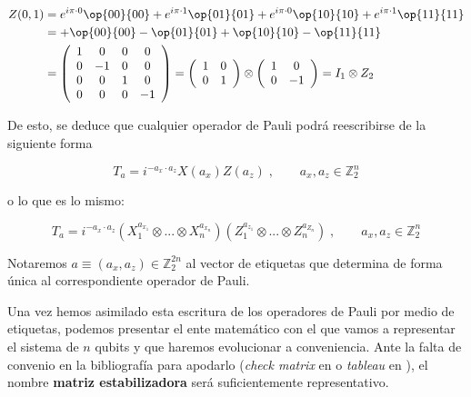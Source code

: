 \documentclass[11pt,a4paper,twoside,pdf]{article}
\numberwithin{equation}{section}
\begin{document}
		\begin{equation*}
			\begin{aligned}
			Z(0,1) &= e^{i\pi \cdot 0}\op{00}{00} + e^{i\pi \cdot 1} \op{01}{01} + e^{i\pi \cdot 0}\op{10}{10} +  
								e^{i\pi\cdot 1}\op{11}{11} \\ 
						&= +\op{00}{00} - \op{01}{01} + \op{10}{10} - \op{11}{11} \\
						&= \left(\begin{array}{cccc}
								1 & 0 & 0 & 0\\
								0 & -1 & 0 & 0\\
								0 & 0 & 1 & 0\\
								0 & 0 & 0 & -1
								\end{array}\right)	
							= \left(\begin{array}{cc} 1 & 0 \\ 0 & 1	\end{array}\right) \otimes
								\left(\begin{array}{cc} 1 & 0 \\ 0 & -1	\end{array}\right) = I_1 \otimes Z_2
			\end{aligned}			
		\end{equation*}
	
	De esto, se deduce que cualquier operador de Pauli podrá reescribirse de la siguiente forma
	
		\begin{equation}\label{eq: Operador Pauli etiqueta 1}
			T_a = i^{- a_x \cdot a_z} X(a_x) Z(a_z) \; , \qquad a_x, a_z \in \mathbb{Z}_2^n  
		\end{equation}
	
	o lo que es lo mismo:
	
		\begin{equation}\label{eq: Operador Pauli etiqueta 2}
			T_a = i^{- a_x \cdot a_z} \left( X_1^{a_{x_1}} \otimes ... \otimes X_n^{a_{x_n}}\right) 
			 		\left( Z_1^{a_{z_1}} \otimes ... \otimes Z_n^{a_{Z_n}}\right) \; , \qquad a_x, a_z
			 		 \in \mathbb{Z}_2^n  
		\end{equation}
		
	Notaremos $a \equiv (a_x,a_z) \in \mathbb{Z}_2^{2n}$ al vector de etiquetas que determina de forma única al correspondiente operador de Pauli.
	
	Una vez hemos asimilado esta escritura de los operadores de Pauli por medio de etiquetas, podemos presentar el ente matemático con el que vamos a representar el sistema de $n$ qubits y que haremos evolucionar a conveniencia. Ante la falta de convenio en la bibliografía para apodarlo (\textit{check matrix} en \cite{NielsenChuang} o \textit{tableau} en \cite{Aaronson}), el nombre \textbf{matriz estabilizadora} será suficientemente representativo.
	
\end{document}
